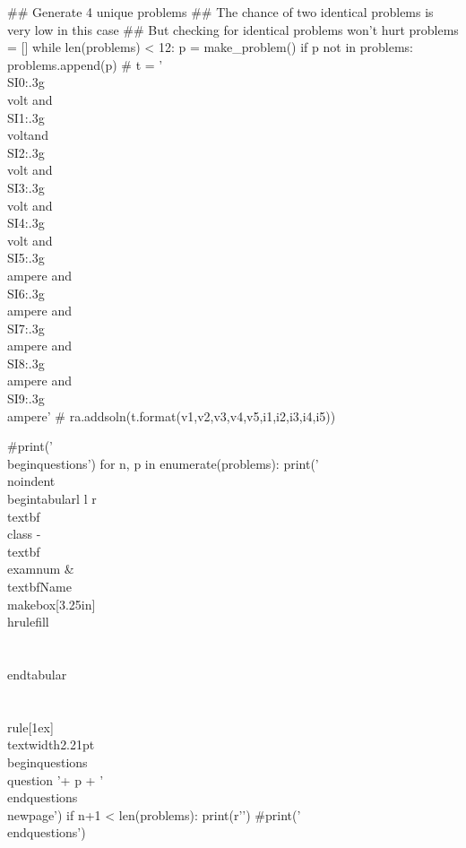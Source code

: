 \documentclass[12pt]{exam}
\newcommand{\class}{PHYS 201}
\newcommand{\examnum}{CO6 (v1)}
\begin{document}
\begin{pycode}
## Generate 4 unique problems
## The chance of two identical problems is very low in this case
## But checking for identical problems won't hurt
problems = []
while len(problems) < 12:
    p = make_problem()
    if p not in problems:
        problems.append(p)
#        t = '\\SI{{{0:.3g}}}{{\\volt}} and \\SI{{{1:.3g}}}{{\\volt}}and \\SI{{{2:.3g}}}{{\\volt}} and \\SI{{{3:.3g}}}{{\\volt}} and \\SI{{{4:.3g}}}{{\\volt}} and \\SI{{{5:.3g}}}{{\\ampere}} and \\SI{{{6:.3g}}}{{\\ampere}} and \\SI{{{7:.3g}}}{{\\ampere}} and \\SI{{{8:.3g}}}{{\\ampere}} and \\SI{{{9:.3g}}}{{\\ampere}}'
#        ra.addsoln(t.format(v1,v2,v3,v4,v5,i1,i2,i3,i4,i5))

#print('\\begin{questions}')
for n, p in enumerate(problems):
    print('\\noindent \\begin{tabular}{l l r} \\textbf{\\class} - \\textbf{\\examnum}  & \\textbf{Name} \\makebox[3.25in]{\\hrulefill}  \\\\ \\end{tabular} \\\\ \\rule[1ex]{\\textwidth}{2.21pt} \\begin{questions}\\question '+ p + '\\end{questions}\\newpage')
    if n+1 < len(problems):
        print(r'\vspace{1in}')
#print('\\end{questions}')


\end{pycode}
\end{document}
